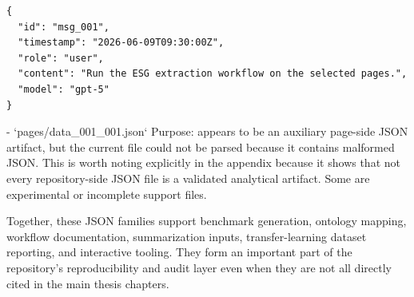 \begin{verbatim}
{
  "id": "msg_001",
  "timestamp": "2026-06-09T09:30:00Z",
  "role": "user",
  "content": "Run the ESG extraction workflow on the selected pages.",
  "model": "gpt-5"
}
\end{verbatim}

- `pages/data_001_001.json`
  Purpose:
  appears to be an auxiliary page-side JSON artifact, but the current file could not be parsed because it contains malformed JSON.
  This is worth noting explicitly in the appendix because it shows that not every repository-side JSON file is a validated analytical artifact. Some are experimental or incomplete support files.


Together, these JSON families support benchmark generation, ontology mapping, workflow documentation, summarization inputs, transfer-learning dataset reporting, and interactive tooling. They form an important part of the repository’s reproducibility and audit layer even when they are not all directly cited in the main thesis chapters.
